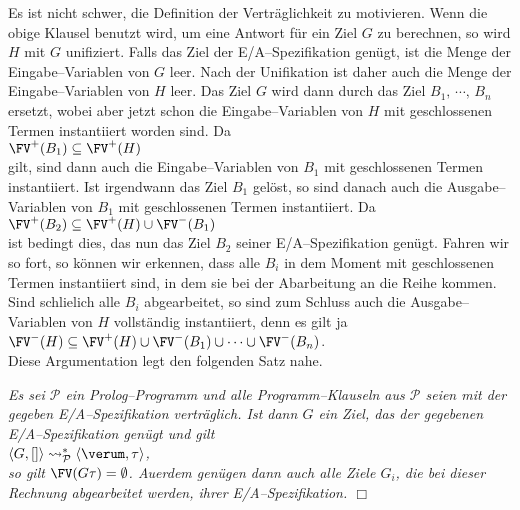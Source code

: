 Es ist nicht schwer, die Definition der Vertr\"{a}glichkeit zu motivieren.  Wenn die obige Klausel
benutzt wird, um eine Antwort f\"{u}r ein Ziel $G$ zu berechnen, so wird $H$ mit $G$ unifiziert.
Falls das Ziel der E/A--Spezifikation gen\"{u}gt, ist die Menge der Eingabe--Variablen von $G$ leer.
Nach der Unifikation ist daher auch die Menge der Eingabe--Variablen von $H$ leer.  Das Ziel $G$ wird dann
durch das Ziel $B_1\mathtt{,}\, \cdots\mathtt{,}\, B_n$ ersetzt, wobei aber jetzt schon die Eingabe--Variablen
von $H$ mit geschlossenen Termen instantiiert worden sind.  Da \\[0.1cm]
\hspace*{1.3cm} $\FV^+(B_1) \subseteq \FV^+(H)$ \\[0.1cm]
gilt, sind dann auch die Eingabe--Variablen von $B_1$ mit geschlossenen Termen instantiiert.  
Ist irgendwann das Ziel $B_1$ gel\"{o}st, so sind danach auch die Ausgabe--Variablen von $B_1$ 
mit geschlossenen Termen instantiiert.  Da \\[0.1cm]
\hspace*{1.3cm} $\FV^+(B_2) \subseteq \FV^+(H) \cup \FV^-(B_1)$ \\[0.1cm]
ist bedingt dies, das nun das Ziel $B_2$ seiner E/A--Spezifikation gen\"{u}gt.  Fahren wir so fort,  so  k\"{o}nnen wir 
erkennen, dass alle  $B_i$ in dem Moment mit geschlossenen Termen instantiiert sind, in dem sie bei der Abarbeitung
an die Reihe kommen.  Sind schlie\3lich alle $B_i$ abgearbeitet, so sind zum Schluss auch die Ausgabe--Variablen von
$H$ vollst\"{a}ndig instantiiert, denn es gilt ja \\[0.1cm]
\hspace*{1.3cm}  $\FV^-(H) \subseteq \FV^+(H) \cup \FV^-(B_1) \cup \cdots \cup \FV^-(B_{n})$. \\[0.1cm]
Diese Argumentation legt den folgenden Satz nahe.

\begin{Satz} \label{vertraelich}
{\em
    Es sei $\mathcal{P}$ ein Prolog--Programm und alle Programm--Klauseln aus $\mathcal{P}$ seien mit 
    der gegeben E/A--Spezifikation vertr\"{a}glich.  Ist dann $G$ ein Ziel, das der gegebenen E/A--Spezifikation
    gen\"{u}gt und gilt \\[0.1cm]
    \hspace*{1.3cm} $\langle G, [] \rangle \leadsto_\mathcal{P}^* \langle \verum, \tau\rangle$, \\[0.1cm]
    so gilt $\FV(G\tau) = \emptyset$.  Au\3erdem gen\"{u}gen dann auch alle Ziele $G_i$, die bei dieser Rechnung abgearbeitet werden,
    ihrer E/A--Spezifikation.
    \hspace*{\fill} $\Box$
}
\end{Satz}

